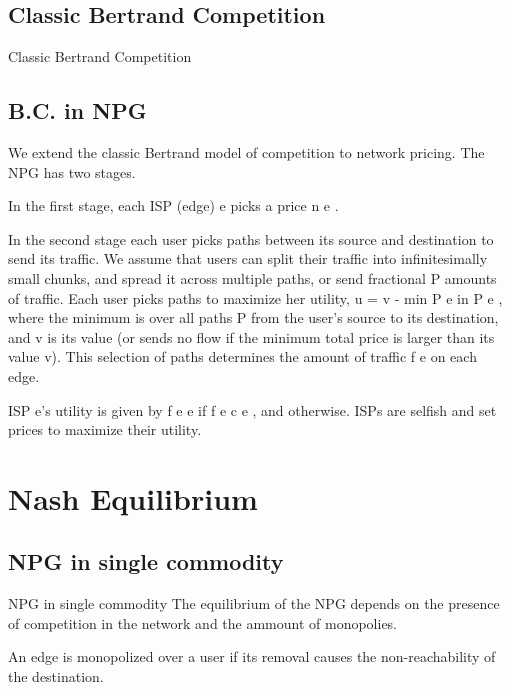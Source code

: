 \documentclass{beamer}
\begin{document}
\subsection{Classic Bertrand Competition}

\begin{frame}{Classic Bertrand Competition}

\end{frame}


\subsection{B.C. in NPG}

\begin{frame}
We extend the classic Bertrand model of competition to network pricing. The
NPG has two stages.

In the first stage, each ISP (edge) e picks a price n e .

In the second stage each user picks paths between its source and destination to send
its traffic. We assume that users can split their traffic into infinitesimally small
chunks, and spread it across multiple paths, or send fractional
P amounts of traffic.
Each user picks paths to maximize her utility, u = v - min P e in P e , where the
minimum is over all paths P from the user’s source to its destination, and v is
its value (or sends no flow if the minimum total price is larger than its value v).
This selection of paths determines the amount of traffic f e on each edge.

ISP e’s
utility is given by f e e if f e  c e , and  otherwise. ISPs are selfish and set
prices to maximize their utility.
\end{frame}


\section{Nash Equilibrium}

\subsection{NPG in single commodity}

\begin{frame}{NPG in single commodity}
  The equilibrium of the NPG depends on the presence of competition in the network and the ammount of monopolies.
  \begin{definition}[Monopoly]
    An edge is monopolized over a user if its removal causes the non-reachability of the destination.
  \end{definition}
\end{frame}
\end{document}
